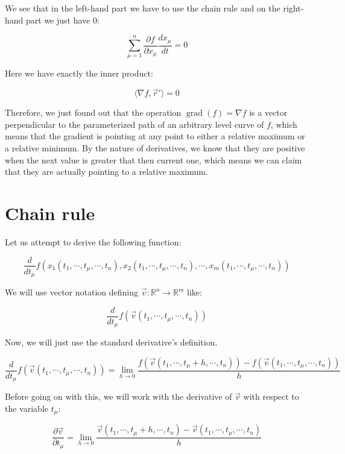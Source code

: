 \documentclass[12pt]{article}
\begin{document}
	We see that in the left-hand part we have to use the chain rule and on the right-hand part we just have 0:
	
	\[
		\sum_{\mu = 1}^n \frac{\partial f}{\partial x_\mu} \frac{dx_\mu}{dt} = 0
	\]
	
	Here we have exactly the inner product:
	
	\[
		\langle \nabla f, \vec{r}' \rangle = 0
	\]
	
	Therefore, we just found out that the operation $\operatorname{grad}(f) = \nabla f$ is a vector perpendicular to the parameterized path of an arbitrary level curve of $f$, which means that the gradient is pointing at any point to either a relative maximum or a relative minimum. By the nature of derivatives, we know that they are positive when the next value is greater that then current one, which means we can claim that they are actually pointing to a relative maximum.
	
	
	\section{Chain rule}
	
	Let us attempt to derive the following function:
	
	\[
		\frac{d}{dt_\mu}f(x_1(t_1, \cdots, t_\mu, \cdots, t_n), x_2(t_1, \cdots, t_\mu, \cdots, t_n), \cdots, x_m(t_1, \cdots, t_\mu, \cdots, t_n))
	\]
	
	We will use vector notation defining $\vec{v} : \mathbb{R}^n \to \mathbb{R}^m$ like:
	
	\[
		\frac{d}{dt_\mu}f(\vec{v}(t_1, \cdots, t_\mu, \cdots, t_n))
	\]
	
	Now, we will just use the standard derivative's definition.
	
	\[
		\frac{d}{dt_\mu}f(\vec{v}(t_1, \cdots, t_\mu, \cdots, t_n))
		= \lim_{h \to 0} \frac{f(\vec{v}(t_1, \cdots, t_\mu + h, \cdots, t_n)) - f(\vec{v}(t_1, \cdots, t_\mu, \cdots, t_n))}{h}
	\]
	
	Before going on with this, we will work with the derivative of $\vec{v}$ with respect to the variable $t_\mu$:
	
	\[
		\frac{\partial \vec{v}}{\partial t_\mu}
		= \lim_{h \to 0} \frac{\vec{v}(t_1, \cdots, t_\mu + h, \cdots, t_n) - \vec{v}(t_1, \cdots, t_\mu, \cdots, t_n)}{h}
	\]
	
\end{document}
